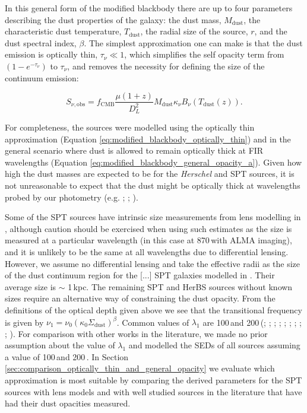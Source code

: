 In this general form of the modified blackbody there are up to four parameters describing the dust properties of the galaxy: the dust mass, $M_{\textrm{dust}}$, the characteristic dust temperature, $T_{\textrm{dust}}$, the radial size of the source, $r$, and the dust spectral index, $\beta$. The simplest approximation one can make is that the dust emission is optically thin, $\tau_\nu \ll 1$, which simplifies the self opacity term from $(1 - e^{-\tau_\nu})$ to $\tau_\nu$, and removes the necessity for defining the size of the continuum emission:

\begin{equation}
	S_{\nu, \textrm{obs}} = f_{\textrm{CMB}}\frac{\mu (1+z)}{D_L^2}M_{\textrm{dust}}\kappa_\nu B_\nu(T_{\textrm{dust}}(z)).
	\label{eq:modified_blackbody_optically_thin}
\end{equation}

For completeness, the sources were modelled using the optically thin approximation (Equation \ref{eq:modified_blackbody_optically_thin}) and in the general scenario where dust is allowed to remain optically thick at FIR wavelengths (Equation \ref{eq:modified_blackbody_general_opacity_a}). Given how high the dust masses are expected to be for the \textit{Herschel} and SPT sources, it is not unreasonable to expect that the dust might be optically thick at wavelengths probed by our photometry (e.g. \citealt{Conley_2011}; \citealt{Casey_2019}; \citealt{Cortzen_2020}). 

Some of the SPT sources have intrinsic size measurements from lens modelling in \citealt{Spilker_2016}, although caution should be exercised when using such estimates as the size is measured at a particular wavelength (in this case at 870\,\micron with ALMA imaging), and it is unlikely to be the same at all wavelengths due to differential lensing. However, we assume no differential lensing and take the effective radii as the size of the dust continuum region for the [...] SPT galaxies modelled in \citealt{Spilker_2016}. Their average size is $\sim$ 1\,kpc. The remaining SPT and HerBS sources without known sizes require an alternative way of constraining the dust opacity. From the definitions of the optical depth given above we see that the transitional frequency is given by $\nu_1 = \nu_0(\kappa_0 \Sigma_{\textrm{dust}})^\beta$. Common values of $\lambda_1$ are 100\,\micron and 200\,\micron (\citealt{Blain_2003}; \citealt{Draine_2006}; \citealt{Conley_2011}; \citealt{Rangwala_2011}; \citealt{Greve_2012}; \citealt{Casey_2014}; \citealt{Spilker_2016}; \citealt{Casey_2019}; \citealt{Cooper_2022}; \citealt{Drew_2022}). For comparison with other works in the literature, we made no prior assumption about the value of $\lambda_1$ and modelled the SEDs of all sources assuming a value of 100\,\micron and 200\,\micron. In Section \ref{sec:comparison_optically_thin_and_general_opacity} we evaluate which approximation is most suitable by comparing the derived parameters for the SPT sources with lens models and with well studied sources in the literature that have had their dust opacities measured.

